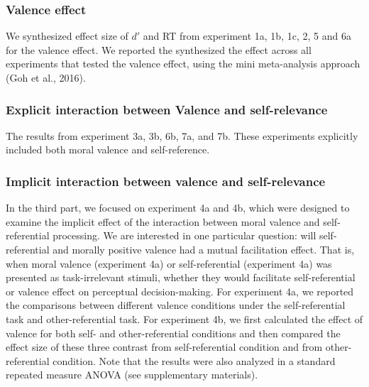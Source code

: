 \documentclass[
  english,
  man]{apa6}
\begin{document}
\hypertarget{valence-effect}{%
\subsubsection{Valence effect}\label{valence-effect}}

We synthesized effect size of \(d'\) and RT from experiment 1a, 1b, 1c, 2, 5 and 6a for the valence effect. We reported the synthesized the effect across all experiments that tested the valence effect, using the mini meta-analysis approach (Goh et al., 2016).

\hypertarget{explicit-interaction-between-valence-and-self-relevance}{%
\subsubsection{Explicit interaction between Valence and self-relevance}\label{explicit-interaction-between-valence-and-self-relevance}}

The results from experiment 3a, 3b, 6b, 7a, and 7b. These experiments explicitly included both moral valence and self-reference.

\hypertarget{implicit-interaction-between-valence-and-self-relevance}{%
\subsubsection{Implicit interaction between valence and self-relevance}\label{implicit-interaction-between-valence-and-self-relevance}}

In the third part, we focused on experiment 4a and 4b, which were designed to examine the implicit effect of the interaction between moral valence and self-referential processing. We are interested in one particular question: will self-referential and morally positive valence had a mutual facilitation effect. That is, when moral valence (experiment 4a) or self-referential (experiment 4a) was presented as task-irrelevant stimuli, whether they would facilitate self-referential or valence effect on perceptual decision-making. For experiment 4a, we reported the comparisons between different valence conditions under the self-referential task and other-referential task. For experiment 4b, we first calculated the effect of valence for both self- and other-referential conditions and then compared the effect size of these three contrast from self-referential condition and from other-referential condition. Note that the results were also analyzed in a standard repeated measure ANOVA (see supplementary materials).
\end{document}
